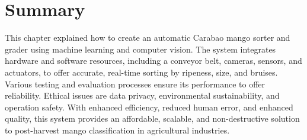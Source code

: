 \section{Summary}
This chapter explained how to create an automatic Carabao mango sorter and grader using machine learning and computer vision. The system integrates hardware and software resources, including a conveyor belt, cameras, sensors, and actuators, to offer accurate, real-time sorting by ripeness, size, and bruises. Various testing and evaluation processes ensure its performance to offer reliability. Ethical issues are data privacy, environmental sustainability, and operation safety. With enhanced efficiency, reduced human error, and enhanced quality, this system provides an affordable, scalable, and non-destructive solution to post-harvest mango classification in agricultural industries.
